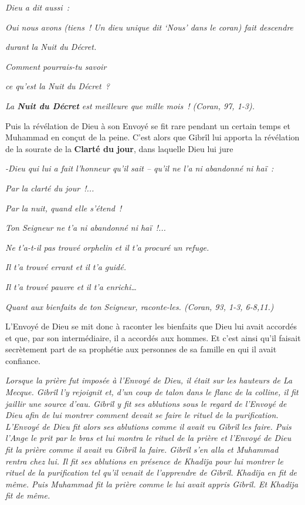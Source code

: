 \emph{Dieu a dit aussi~:}

\emph{Oui nous avons (tiens~! Un dieu unique dit `Nous' dans le coran)
fait descendre}

\emph{durant la Nuit du Décret.}

\emph{Comment pourrais-tu savoir}

\emph{ce qu'est la Nuit du Décret~?}

\emph{La \textbf{Nuit du Décret} est meilleure que mille mois~! (Coran,
97, 1-3).}

Puis la révélation de Dieu à son Envoyé se fit rare pendant un certain
temps et Muhammad en conçut de la peine. C'est alors que Gibrîl lui
apporta la révélation de la sourate de la \textbf{Clarté du jour}, dans
laquelle Dieu lui jure

\emph{-Dieu qui lui a fait l'honneur qu'il sait -- qu'il ne l'a ni
abandonné ni haï~:}

\emph{Par la clarté du jour~!...}

\emph{Par la nuit, quand elle s'étend~!}

\emph{Ton Seigneur ne t'a ni abandonné ni haï~!...}

\emph{Ne t'a-t-il pas trouvé orphelin et il t'a procuré un refuge.}

\emph{Il t'a trouvé errant et il t'a guidé.}

\emph{Il t'a trouvé pauvre et il t'a enrichi\ldots{}}

\emph{Quant aux bienfaits de ton Seigneur, raconte-les. (Coran, 93, 1-3,
6-8,11.)}

L'Envoyé de Dieu se mit donc à raconter les bienfaits que Dieu lui avait
accordés et que, par son intermédiaire, il a accordés aux hommes. Et
c'est ainsi qu'il faisait secrètement part de sa prophétie aux personnes
de sa famille en qui il avait confiance.


\emph{Lorsque la prière fut imposée à l'Envoyé de Dieu, il était sur les
hauteurs de La Mecque. Gibrîl l'y rejoignit et, d'un coup de talon dans
le flanc de la colline, il fit jaillir une source d'eau. Gibrîl y fit
ses ablutions sous le regard de l'Envoyé de Dieu afin de lui montrer
comment devait se faire le rituel de la purification. L'Envoyé de Dieu
fit alors ses ablutions comme il avait vu Gibrîl les faire. Puis l'Ange
le prit par le bras et lui montra le rituel de la prière et l'Envoyé de
Dieu fit la prière comme il avait vu Gibrîl la faire. Gibrîl s'en alla
et Muhammad rentra chez lui. Il fit ses ablutions en présence de Khadîja
pour lui montrer le rituel de la purification tel qu'il venait de
l'apprendre de Gibrîl. Khadîja en fit de même. Puis Muhammad fit la
prière comme le lui avait appris Gibrîl. Et Khadîja fit de même.}

